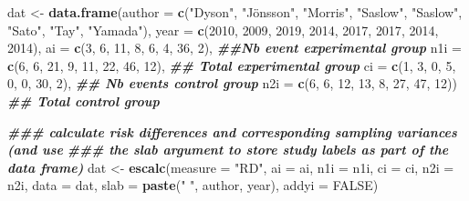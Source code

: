 \documentclass[
]{book}
\newenvironment{Shaded}{\begin{snugshade}}{\end{snugshade}}
\newcommand{\AttributeTok}[1]{\textcolor[rgb]{0.13,0.29,0.53}{#1}}
\newcommand{\ConstantTok}[1]{\textcolor[rgb]{0.56,0.35,0.01}{#1}}
\newcommand{\DecValTok}[1]{\textcolor[rgb]{0.00,0.00,0.81}{#1}}
\newcommand{\DocumentationTok}[1]{\textcolor[rgb]{0.56,0.35,0.01}{\textbf{\textit{#1}}}}
\newcommand{\FunctionTok}[1]{\textcolor[rgb]{0.13,0.29,0.53}{\textbf{#1}}}
\newcommand{\NormalTok}[1]{#1}
\newcommand{\OtherTok}[1]{\textcolor[rgb]{0.56,0.35,0.01}{#1}}
\newcommand{\StringTok}[1]{\textcolor[rgb]{0.31,0.60,0.02}{#1}}
\begin{document}
\begin{Shaded}
\begin{Highlighting}[]
\NormalTok{dat }\OtherTok{\textless{}{-}} \FunctionTok{data.frame}\NormalTok{(}\AttributeTok{author =} \FunctionTok{c}\NormalTok{(}\StringTok{"Dyson"}\NormalTok{, }\StringTok{"Jönsson"}\NormalTok{, }\StringTok{"Morris"}\NormalTok{, }\StringTok{"Saslow"}\NormalTok{, }\StringTok{"Saslow"}\NormalTok{, }\StringTok{"Sato"}\NormalTok{, }\StringTok{"Tay"}\NormalTok{, }\StringTok{"Yamada"}\NormalTok{),}
                  \AttributeTok{year   =} \FunctionTok{c}\NormalTok{(}\DecValTok{2010}\NormalTok{, }\DecValTok{2009}\NormalTok{, }\DecValTok{2019}\NormalTok{, }\DecValTok{2014}\NormalTok{, }\DecValTok{2017}\NormalTok{, }\DecValTok{2017}\NormalTok{, }\DecValTok{2014}\NormalTok{, }\DecValTok{2014}\NormalTok{),}
                  \AttributeTok{ai     =} \FunctionTok{c}\NormalTok{(}\DecValTok{3}\NormalTok{, }\DecValTok{6}\NormalTok{, }\DecValTok{11}\NormalTok{, }\DecValTok{8}\NormalTok{, }\DecValTok{6}\NormalTok{, }\DecValTok{4}\NormalTok{, }\DecValTok{36}\NormalTok{, }\DecValTok{2}\NormalTok{), }\DocumentationTok{\#\#Nb event experimental group}
                  \AttributeTok{n1i    =} \FunctionTok{c}\NormalTok{(}\DecValTok{6}\NormalTok{, }\DecValTok{6}\NormalTok{, }\DecValTok{21}\NormalTok{, }\DecValTok{9}\NormalTok{, }\DecValTok{11}\NormalTok{, }\DecValTok{22}\NormalTok{, }\DecValTok{46}\NormalTok{, }\DecValTok{12}\NormalTok{), }\DocumentationTok{\#\# Total experimental group}
                  \AttributeTok{ci     =} \FunctionTok{c}\NormalTok{(}\DecValTok{1}\NormalTok{, }\DecValTok{3}\NormalTok{, }\DecValTok{0}\NormalTok{, }\DecValTok{5}\NormalTok{, }\DecValTok{0}\NormalTok{, }\DecValTok{0}\NormalTok{, }\DecValTok{30}\NormalTok{, }\DecValTok{2}\NormalTok{),  }\DocumentationTok{\#\# Nb events control group}
                  \AttributeTok{n2i    =} \FunctionTok{c}\NormalTok{(}\DecValTok{6}\NormalTok{, }\DecValTok{6}\NormalTok{, }\DecValTok{12}\NormalTok{, }\DecValTok{13}\NormalTok{, }\DecValTok{8}\NormalTok{, }\DecValTok{27}\NormalTok{, }\DecValTok{47}\NormalTok{, }\DecValTok{12}\NormalTok{))  }\DocumentationTok{\#\# Total control group}

\DocumentationTok{\#\#\# calculate risk differences and corresponding sampling variances (and use}
\DocumentationTok{\#\#\# the \textquotesingle{}slab\textquotesingle{} argument to store study labels as part of the data frame)}
\NormalTok{dat }\OtherTok{\textless{}{-}} \FunctionTok{escalc}\NormalTok{(}\AttributeTok{measure =} \StringTok{"RD"}\NormalTok{, }\AttributeTok{ai =}\NormalTok{ ai, }\AttributeTok{n1i =}\NormalTok{ n1i, }\AttributeTok{ci =}\NormalTok{ ci, }\AttributeTok{n2i =}\NormalTok{ n2i, }\AttributeTok{data =}\NormalTok{ dat,}
              \AttributeTok{slab =} \FunctionTok{paste}\NormalTok{(}\StringTok{" "}\NormalTok{, author, year), }\AttributeTok{addyi =} \ConstantTok{FALSE}\NormalTok{)}


\end{Highlighting}
\end{Shaded}
\end{document}
